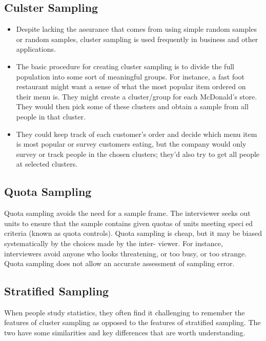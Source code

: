 ﻿\documentclass[]{report}
\begin{document}

\subsection{Culster Sampling}
\begin{itemize}
\item Despite lacking the assurance that comes from using simple random samples or random samples, cluster sampling is used frequently in business and other applications. 

\item The basic procedure for creating cluster sampling is to divide the full population into some sort of meaningful groups. For instance, a fast foot restaurant might want a sense of what the most popular item ordered on their menu is. They might create a cluster/group for each McDonald’s store. They would then pick some of these clusters and obtain a sample from all people in that cluster. 
\item They could keep track of each customer’s order and decide which menu item is most popular or survey customers eating, but the company would only survey or track people in the chosen clusters; they’d also try to get all people at selected clusters. 

\end{itemize}




\normalsize
\subsection{Quota Sampling}

Quota sampling avoids the need for a sample frame. The interviewer seeks out units to ensure that
the sample contains given quotas of units meeting specied criteria (known as quota controls).
Quota sampling is cheap, but it may be biased systematically by the choices made by the inter-
viewer. For instance, interviewers avoid anyone who looks threatening, or too busy, or too strange.
Quota sampling does not allow an accurate assessment of sampling error.

\subsection{Stratified Sampling}

When people study statistics, they often find it challenging to remember the features of cluster sampling as opposed to the features of stratified sampling. The two have some similarities and key differences that are worth understanding. 
\end{document}
